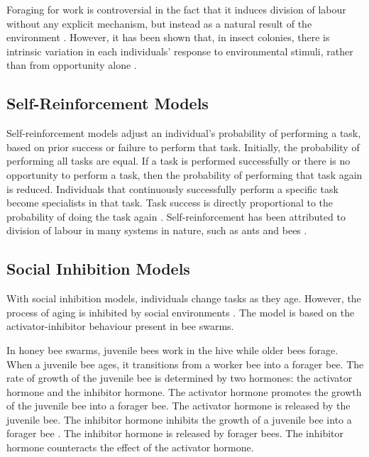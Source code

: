 Foraging for work is controversial in the fact that it induces division of labour without any explicit mechanism, but instead as a natural result of the environment \cite{beshers2001models}. However, it has been shown that, in insect colonies, there is intrinsic variation in each individuals' response to environmental  stimuli, rather than from opportunity alone \cite{julian1999undertaking}.

\subsection{Self-Reinforcement Models}
\label{selfreinforcement}

Self-reinforcement models adjust an individual's probability of performing a task, based on prior success or failure to perform that task. Initially, the probability of performing all tasks are equal. If a task is performed successfully or there is  no opportunity to perform a task, then the probability of performing that task again is reduced. Individuals that continuously successfully perform a specific task become specialists in that task. Task success is directly proportional to the probability of doing the task again \cite{theraulaz1998response, pasteels1987individual}. Self-reinforcement has been attributed to division of labour in many systems in nature, such as ants and bees \cite{spencer1998dynamics}.

\subsection{Social Inhibition Models}
\label{socialinhibitionmodels}
With social inhibition models, individuals change tasks as they age. However, the process of aging is inhibited by social environments \cite{huang1992honeybee}. The model is based on the activator-inhibitor behaviour present in bee swarms. 

In honey bee swarms, juvenile bees work in the hive while older bees forage. When a juvenile bee ages, it transitions from a worker bee into a forager bee. The rate of growth of the juvenile bee is determined by two hormones: the activator hormone and the inhibitor hormone. The activator hormone promotes the growth of the juvenile bee into a forager bee. The activator hormone is released by the juvenile bee. The inhibitor hormone inhibits the growth of a juvenile bee into a forager bee \cite{huang1992honeybee}. The inhibitor hormone is released by forager bees. The inhibitor hormone counteracts the effect of the activator hormone.

